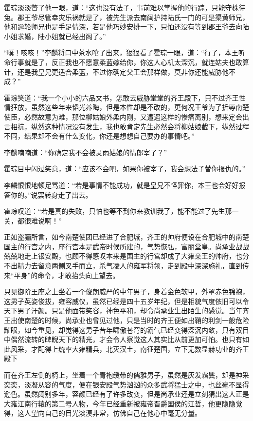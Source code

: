 霍琮淡淡瞥了他一眼，道：“这也没有法子，事前难以掌握他的行踪，只能守株待兔。郡王爷尽管幸灾乐祸就是了，被先生派去南闽护持陆氏一门的可是渠黄师兄，他和逾轮师兄也是手足情深，若是他巧妙安排一下，只怕还没有等到郡王爷去向陆小姐求婚，陆小姐就已经出阁了。”

“噗！咳咳！”李麟将口中茶水呛了出来，狠狠看了霍琮一眼，道：“行了，本王听命行事就是了，反正我也不愿意柔蓝嫁给你，你这人心机太深沉，就连姑夫也敢算计，还是我皇兄更适合柔蓝，不过你确定父王会那样做，莫非你还能威胁他不成？”

霍琮笑道：“我一个小小的六品文书，怎敢去威胁堂堂的齐王殿下，只不过齐王性情狂放，虽然这些年来韬光养晦，但是本性却是不改的，更何况王爷为了折辱南楚使臣，必然故意为难，那位柳姑娘外柔内刚，又遭遇这样的惨痛离别，想来定会出言相抗，纵然这种情况没有发生，我也敢肯定先生必然会将柳姑娘截下，纵然过程不同，结果却不会有什么变化，你还是想想自己要办的事情吧。”

李麟喃喃道：“你确定我不会被灵雨姑娘的情郎宰了？”

霍琮目中闪过笑意，道：“应该不会吧，如果你被宰了，我会想法子替你报仇的。”

李麟恨恨地顿足骂道：“若是事情不能成功，就是皇兄不怪罪你，本王也会好好报答你的。”说罢转身走了出去。

霍琮叹道：“若是真的失败，只怕也等不到你来教训我了，能不能过了先生那一关，都很难说啊！”

正如盗骊所言，如今南楚使团已经进了合肥城，齐王的帅府便设在合肥城中的南楚国主的行宫之内，座行宫本是武帝时候所建的，气势恢弘，富丽堂皇。尚承业战战兢兢地走上银安殿，也顾不得感叹本来是国主的行宫却成了大雍亲王的帅府，也分不出精力去留意两侧叉手而立，杀气凌人的雍军将领，走到殿中深深施礼，直到传来“平身”的命令，才敢抬头向上望去。

只见御阶王座之上坐着一个俊朗威严的中年男子，身着金色软甲，外罩赤色锦袍，这男子英姿俊拔，雍容威仪，虽然已经是四十五岁年纪，但是相貌气度依旧可以令天下男子汗颜。只是他面带笑容，神色平和，却令尚承业生出陌生的感觉。当年齐王出使南楚的时候，尚承业也曾见过他，只是当时的齐王便如出鞘的利剑一般危险耀眼，如今重见，却觉得这男子昔年啸傲苍穹的霸气已经变得深沉内敛，只有双目中偶然流转的睥睨天下的精光，才会令人察觉这人其实比从前更加可怕。也只有如此风采，才配得上统率大雍精兵，北灭汉土，南征楚国，立下无数显赫功业的齐王殿下

而在齐王左侧的椅上，坐着一个青袍绶带的儒雅男子，虽然是灰发霜鬓，却是神采奕奕，淡凝从容的气度，便在银安殿气势汹汹的众多武将猛士之中，也丝毫不显得逊色。虽然阔别多年，容颜已经有了许多改变，但是尚承业还是立刻猜出这人正是大雍江南行辕的第二号人物，今年已经重新被雍帝晋爵国侯的江哲，他更隐隐觉得，这人望向自己的目光淡漠非常，仿佛自己在他心中毫无分量。

